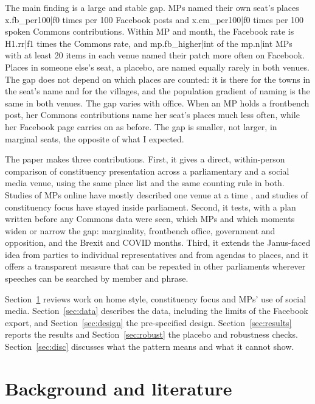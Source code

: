 \documentclass[11pt,a4paper]{article}
\begin{document}
The main finding is a large and stable gap. MPs named their own seat's places {{x.fb_per100|f0}} times per 100 Facebook posts and {{x.cm_per100|f0}} times per 100 spoken Commons contributions. Within MP and month, the Facebook rate is {{H1.rr|f1}} times the Commons rate, and {{mp.fb_higher|int}} of the {{mp.n|int}} MPs with at least 20 items in each venue named their patch more often on Facebook. Places in someone else's seat, a placebo, are named equally rarely in both venues. The gap does not depend on which places are counted: it is there for the towns in the seat's name and for the villages, and the population gradient of naming is the same in both venues. The gap varies with office. When an MP holds a frontbench post, her Commons contributions name her seat's places much less often, while her Facebook page carries on as before. The gap is smaller, not larger, in marginal seats, the opposite of what I expected.

The paper makes three contributions. First, it gives a direct, within-person comparison of constituency presentation across a parliamentary and a social media venue, using the same place list and the same counting rule in both. Studies of MPs online have mostly described one venue at a time \citep{jackson2011,southern2019}, and studies of constituency focus have stayed inside parliament. Second, it tests, with a plan written before any Commons data were seen, which MPs and which moments widen or narrow the gap: marginality, frontbench office, government and opposition, and the Brexit and COVID months. Third, it extends the Janus-faced idea from parties to individual representatives and from agendas to places, and it offers a transparent measure that can be repeated in other parliaments wherever speeches can be searched by member and phrase.

Section~\ref{sec:lit} reviews work on home style, constituency focus and MPs' use of social media. Section~\ref{sec:data} describes the data, including the limits of the Facebook export, and Section~\ref{sec:design} the pre-specified design. Section~\ref{sec:results} reports the results and Section~\ref{sec:robust} the placebo and robustness checks. Section~\ref{sec:disc} discusses what the pattern means and what it cannot show.

\section{Background and literature}\label{sec:lit}
\end{document}
